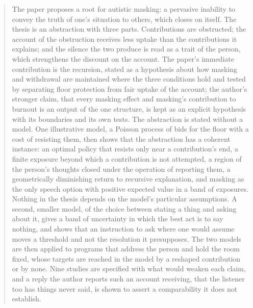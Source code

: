\begin{abstract}
The paper proposes a root for autistic masking: a pervasive inability to convey the truth of one's situation to others, which closes on itself. The thesis is an abstraction with three parts. Contributions are obstructed; the account of the obstruction receives less uptake than the contributions it explains; and the silence the two produce is read as a trait of the person, which strengthens the discount on the account. The paper's immediate contribution is the recursion, stated as a hypothesis about how masking and withdrawal are maintained where the three conditions hold and tested by separating floor protection from fair uptake of the account; the author's stronger claim, that every masking effect and masking's contribution to burnout is an output of the one structure, is kept as an explicit hypothesis with its boundaries and its own tests. The abstraction is stated without a model. One illustrative model, a Poisson process of bids for the floor with a cost of resisting them, then shows that the abstraction has a coherent instance: an optimal policy that resists only near a contribution's end, a finite exposure beyond which a contribution is not attempted, a region of the person's thoughts closed under the operation of reporting them, a geometrically diminishing return to recursive explanation, and masking as the only speech option with positive expected value in a band of exposures. Nothing in the thesis depends on the model's particular assumptions. A second, smaller model, of the choice between stating a thing and asking about it, gives a band of uncertainty in which the best act is to say nothing, and shows that an instruction to ask where one would assume moves a threshold and not the resolution it presupposes. The two models are then applied to programs that address the person and hold the room fixed, whose targets are reached in the model by a reshaped contribution or by none. Nine studies are specified with what would weaken each claim, and a reply the author reports such an account receiving, that the listener too has things never said, is shown to assert a comparability it does not establish.

\end{abstract}
